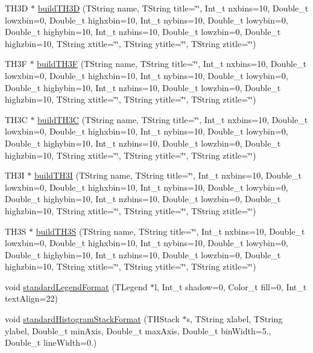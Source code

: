 \begin{DoxyCompactItemize}
\item 
T\-H3\-D $\ast$ \hyperlink{namespace_h_a_l_a67a00482fa3655efa73942e6970aa392}{build\-T\-H3\-D} (T\-String name, T\-String title=\char`\"{}\char`\"{}, Int\-\_\-t nxbins=10, Double\-\_\-t lowxbin=0, Double\-\_\-t highxbin=10, Int\-\_\-t nybins=10, Double\-\_\-t lowybin=0, Double\-\_\-t highybin=10, Int\-\_\-t nzbins=10, Double\-\_\-t lowzbin=0, Double\-\_\-t highzbin=10, T\-String xtitle=\char`\"{}\char`\"{}, T\-String ytitle=\char`\"{}\char`\"{}, T\-String ztitle=\char`\"{}\char`\"{})
\item 
T\-H3\-F $\ast$ \hyperlink{namespace_h_a_l_a6baf4beab40b4609a74ee985a3419f30}{build\-T\-H3\-F} (T\-String name, T\-String title=\char`\"{}\char`\"{}, Int\-\_\-t nxbins=10, Double\-\_\-t lowxbin=0, Double\-\_\-t highxbin=10, Int\-\_\-t nybins=10, Double\-\_\-t lowybin=0, Double\-\_\-t highybin=10, Int\-\_\-t nzbins=10, Double\-\_\-t lowzbin=0, Double\-\_\-t highzbin=10, T\-String xtitle=\char`\"{}\char`\"{}, T\-String ytitle=\char`\"{}\char`\"{}, T\-String ztitle=\char`\"{}\char`\"{})
\item 
T\-H3\-C $\ast$ \hyperlink{namespace_h_a_l_a2c6de3d3a250b42b193d2765171369cf}{build\-T\-H3\-C} (T\-String name, T\-String title=\char`\"{}\char`\"{}, Int\-\_\-t nxbins=10, Double\-\_\-t lowxbin=0, Double\-\_\-t highxbin=10, Int\-\_\-t nybins=10, Double\-\_\-t lowybin=0, Double\-\_\-t highybin=10, Int\-\_\-t nzbins=10, Double\-\_\-t lowzbin=0, Double\-\_\-t highzbin=10, T\-String xtitle=\char`\"{}\char`\"{}, T\-String ytitle=\char`\"{}\char`\"{}, T\-String ztitle=\char`\"{}\char`\"{})
\item 
T\-H3\-I $\ast$ \hyperlink{namespace_h_a_l_a38c9c193d1c35ee5435212eb15139e94}{build\-T\-H3\-I} (T\-String name, T\-String title=\char`\"{}\char`\"{}, Int\-\_\-t nxbins=10, Double\-\_\-t lowxbin=0, Double\-\_\-t highxbin=10, Int\-\_\-t nybins=10, Double\-\_\-t lowybin=0, Double\-\_\-t highybin=10, Int\-\_\-t nzbins=10, Double\-\_\-t lowzbin=0, Double\-\_\-t highzbin=10, T\-String xtitle=\char`\"{}\char`\"{}, T\-String ytitle=\char`\"{}\char`\"{}, T\-String ztitle=\char`\"{}\char`\"{})
\item 
T\-H3\-S $\ast$ \hyperlink{namespace_h_a_l_a6b6e1a59282418554b685f5bc92f30a6}{build\-T\-H3\-S} (T\-String name, T\-String title=\char`\"{}\char`\"{}, Int\-\_\-t nxbins=10, Double\-\_\-t lowxbin=0, Double\-\_\-t highxbin=10, Int\-\_\-t nybins=10, Double\-\_\-t lowybin=0, Double\-\_\-t highybin=10, Int\-\_\-t nzbins=10, Double\-\_\-t lowzbin=0, Double\-\_\-t highzbin=10, T\-String xtitle=\char`\"{}\char`\"{}, T\-String ytitle=\char`\"{}\char`\"{}, T\-String ztitle=\char`\"{}\char`\"{})
\item 
void \hyperlink{namespace_h_a_l_a12ef73e23316a2312276a7d1eee541bc}{standard\-Legend\-Format} (T\-Legend $\ast$l, Int\-\_\-t shadow=0, Color\-\_\-t fill=0, Int\-\_\-t text\-Align=22)
\item 
void \hyperlink{namespace_h_a_l_afcd03337b0d38ae35041d4ec4155c18a}{standard\-Histogram\-Stack\-Format} (T\-H\-Stack $\ast$s, T\-String xlabel, T\-String ylabel, Double\-\_\-t min\-Axis, Double\-\_\-t max\-Axis, Double\-\_\-t bin\-Width=5., Double\-\_\-t line\-Width=0.)
\end{DoxyCompactItemize}


